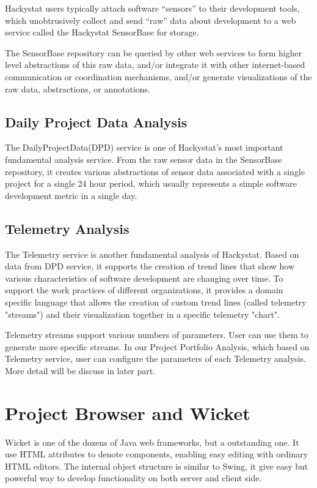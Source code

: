 Hackystat users typically attach software ``sensors'' to their development tools, which unobtrusively collect and send ``raw'' data about development to a web service called the Hackystat SensorBase for storage.

The SensorBase repository can be queried by other web services to form higher level abstractions of this raw data, and/or integrate it with other internet-based communication or coordination mechanisms, and/or generate visualizations of the raw data, abstractions, or annotations.

\subsection{Daily Project Data Analysis}
The DailyProjectData(DPD) service is one of Hackystat's most important fundamental analysis service. From the raw sensor data in the SensorBase repository, it creates various abstractions of sensor data associated with a single project for a single 24 hour period, which usually represents a simple software development metric in a single day.

\subsection{Telemetry Analysis}
The Telemetry service is another fundamental analysis of Hackystat. Based on data from DPD service, it supports the creation of trend lines that show how various characteristics of software development are changing over time. To support the work practices of different organizations, it provides a domain specific language that allows the creation of custom trend lines (called telemetry "streams") and their visualization together in a specific telemetry "chart". 

Telemetry streams support various numbers of parameters. User can use them to generate more specific streams. In our Project Portfolio Analysis, which based on Telemetry service, user can configure the parameters of each Telemetry analysis. More detail will be discuss in later part.

\section {Project Browser and Wicket}
Wicket is one of the dozens of Java web frameworks, but a outstanding one. It use HTML attributes to denote components, enabling easy editing with ordinary HTML editors. The internal object structure is similar to Swing, it give easy but powerful way to develop functionality on both server and client side.

